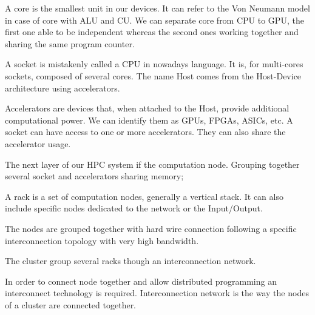\begin{description}
\item[Core:] A core is the smallest unit in our devices. 
It can refer to the Von Neumann model in case of core with ALU and CU. 
We can separate core from CPU to GPU, the first one able to be independent whereas the second ones working together and sharing the same program counter. 
\item[Socket/Host:] A socket is mistakenly called a CPU in nowadays language. It is, for multi-cores sockets, composed of several cores. The name Host comes from the Host-Device architecture using accelerators. 
\item[Accelerators/Devices:] Accelerators are devices that, when attached to the Host, provide additional computational power. 
We can identify them as GPUs, FPGAs, ASICs, etc. 
A socket can have access to one or more accelerators.
They can also share the accelerator usage. 
\item[Computation node: ] The next layer of our HPC system if the computation node. Grouping together several socket and accelerators sharing memory;
\item[Rack: ] A rack is a set of computation nodes, generally a vertical stack. 
It can also include specific nodes dedicated to the network or the Input/Output.
\item[Interconnection: ] The nodes are grouped together with hard wire connection following a specific interconnection topology with very high bandwidth.
\item[System/Cluster/Supercomputer] The cluster group several racks though an interconnection network.
\end{description}

In order to connect node together and allow distributed programming an interconnect technology is required. 
Interconnection network is the way the nodes of a cluster are connected together. 

